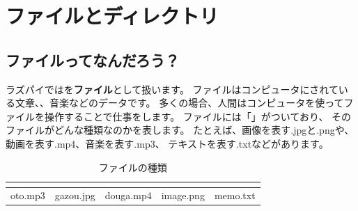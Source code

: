 \documentclass[text03.tex]{subfiles}
\begin{document}
\newpage
\section{ファイルとディレクトリ}
\subsection{ファイルってなんだろう？}
ラズパイではを{\bf ファイル}として扱います。
ファイルはコンピュータにされている文章、、音楽などのデータです。
多くの場合、人間はコンピュータを使ってファイルを操作することで仕事をします。
ファイルには「」がついており、
そのファイルがどんな種類なのかを表します。
たとえば、画像を表す.jpgと.pngや、動画を表す.mp4、音楽を表す.mp3、
テキストを表す.txtなどがあります。

\begin{table}[H]
  \begin{center}
    \caption[tab:files]{ファイルの種類}
    \begin{tabular}{|c|c|c|c|c|} \hline
    \begin{minipage}{0.12\hsize}
      \begin{center}
        
      \end{center}  
    \end{minipage} & 
    \begin{minipage}{0.12\hsize}
      \begin{center}
        
      \end{center}
    \end{minipage} &
    \begin{minipage}{0.12\hsize}
      \begin{center}
        
      \end{center} 
    \end{minipage} &
    \begin{minipage}{0.12\hsize}
      \begin{center}
        
      \end{center} 
    \end{minipage} &
    \begin{minipage}{0.12\hsize}
      \begin{center}
        
      \end{center} 
    \end{minipage} \\ \hline
    oto.mp3 & gazou.jpg & douga.mp4 & image.png & memo.txt \\ \hline
  \end{tabular}
 \end{center}
\end{table}
\end{document}
